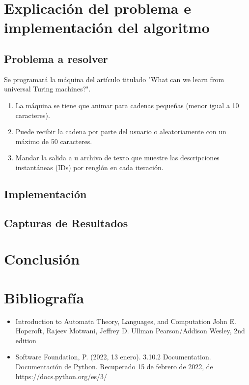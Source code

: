 \documentclass{article}
\begin{document}
\section{Explicaci\'on del problema e implementaci\'on del algoritmo}
\subsection{Problema a resolver}
Se programará la máquina del artículo titulado "What can we learn from universal Turing machines?".
\begin{enumerate}
    \item La máquina se tiene que animar para cadenas pequeñas (menor igual a 10 caracteres).
    \item Puede recibir la cadena por parte del usuario o aleatoriamente con un máximo de 50 caracteres.
    \item Mandar la salida a u archivo de texto que muestre las descripciones instantáneas (IDs) por renglón en cada iteración.
\end{enumerate}
\subsection{Implementaci\'on}
\subsection{Capturas de Resultados}
\section{Conclusi\'on}
\section{Bibliograf\'ia}
\begin{itemize}
    \item Introduction to Automata Theory, Languages, and Computation
    John E. Hopcroft, Rajeev Motwani, Jeffrey D. Ullman
    Pearson/Addison Wesley, 2nd edition
    \item Software Foundation, P. (2022, 13 enero). 3.10.2 Documentation. Documentación de Python. Recuperado 15 de febrero de 2022, de https://docs.python.org/es/3/
\end{itemize}
\end{document}
